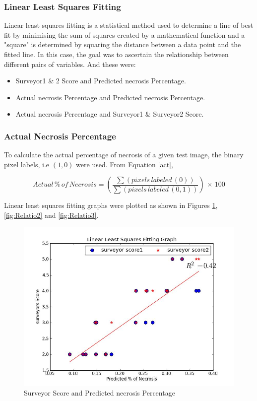 \documentclass[conference]{IEEEtran}
\begin{document}
{\subsubsection{Linear Least Squares Fitting}
 Linear least squares fitting is a statistical method used to determine a line of best fit by minimising the sum of squares created by a mathematical function and a "square" is determined by squaring the distance between a data point and the fitted line. In this case, the goal was to ascertain the relationship between different pairs of variables. And these were:

\begin{itemize}
  \item Surveyor1 \& 2 Score and Predicted necrosis Percentage.
  \item Actual necrosis Percentage and Predicted necrosis Percentage.
  \item Actual necrosis Percentage and Surveyor1 \& Surveyor2 Score.
\end{itemize}


\subsubsection{Actual Necrosis Percentage}
To calculate the actual percentage of necrosis of a given test image, the binary pixel labels, i.e $(1,0)$ were used. From Equation \ref{act},

\begin{equation}\label{act}

     Actual\,\%\, of\, Necrosis = \left(\frac{\sum (pixels \,labeled \,(0))}{\sum (pixels\, labeled\, (0,1))}\right)\,\times

     \,100
\end{equation}



Linear least squares fitting graphs were plotted as shown in Figures \ref{fig:Relatio1}, \ref{fig:Relatio2} and \ref{fig:Relatio3}.

\begin{figure}[t!]
\centering
\includegraphics[scale=0.25]{images/Suveyor_predicted.jpg}
\caption{Surveyor Score and Predicted necrosis Percentage}
\label{fig:Relatio1}
\end{figure}

}
\end{document}
